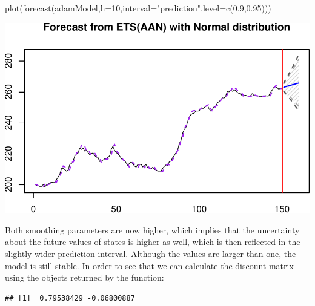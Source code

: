 \documentclass[
]{book}
\newenvironment{Shaded}{\begin{snugshade}}{\end{snugshade}}
\newcommand{\AttributeTok}[1]{\textcolor[rgb]{0.77,0.63,0.00}{#1}}
\newcommand{\ConstantTok}[1]{\textcolor[rgb]{0.00,0.00,0.00}{#1}}
\newcommand{\DecValTok}[1]{\textcolor[rgb]{0.00,0.00,0.81}{#1}}
\newcommand{\FloatTok}[1]{\textcolor[rgb]{0.00,0.00,0.81}{#1}}
\newcommand{\FunctionTok}[1]{\textcolor[rgb]{0.00,0.00,0.00}{#1}}
\newcommand{\NormalTok}[1]{#1}
\newcommand{\OtherTok}[1]{\textcolor[rgb]{0.56,0.35,0.01}{#1}}
\newcommand{\SpecialCharTok}[1]{\textcolor[rgb]{0.00,0.00,0.00}{#1}}
\newcommand{\StringTok}[1]{\textcolor[rgb]{0.31,0.60,0.02}{#1}}
\theoremstyle{definition}
\theoremstyle{definition}
\theoremstyle{definition}
\theoremstyle{definition}
\theoremstyle{remark}
\begin{document}
\begin{Shaded}
\begin{Highlighting}[]
\FunctionTok{plot}\NormalTok{(}\FunctionTok{forecast}\NormalTok{(adamModel,}\AttributeTok{h=}\DecValTok{10}\NormalTok{,}\AttributeTok{interval=}\StringTok{"prediction"}\NormalTok{,}\AttributeTok{level=}\FunctionTok{c}\NormalTok{(}\FloatTok{0.9}\NormalTok{,}\FloatTok{0.95}\NormalTok{)))}
\end{Highlighting}
\end{Shaded}

\includegraphics{adam_files/figure-latex/unnamed-chunk-28-1.pdf}

Both smoothing parameters are now higher, which implies that the uncertainty about the future values of states is higher as well, which is then reflected in the slightly wider prediction interval. Although the values are larger than one, the model is still stable. In order to see that we can calculate the discount matrix using the objects returned by the function:

\begin{Shaded}
\end{Shaded}

\begin{verbatim}
## [1]  0.79538429 -0.06800887
\end{verbatim}
\end{document}
